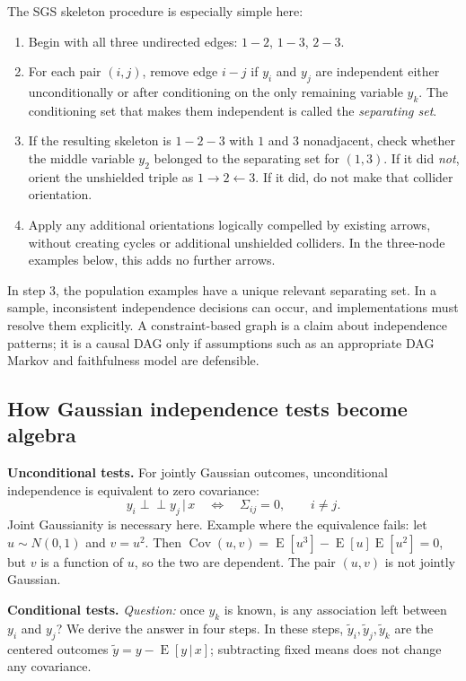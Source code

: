 \documentclass[11pt,a4paper]{article}
\newcommand{\Cov}{\operatorname{Cov}}
\newcommand{\E}{\operatorname{E}}
\newcommand{\indep}{\mathrel{\perp\!\!\!\perp}}
\newcommand{\given}{\,\vert\,}
\newcommand{\yt}{\widetilde y}
\begin{document}
The SGS skeleton procedure is especially simple here:
\begin{enumerate}[leftmargin=*,label=\arabic*.]
\item Begin with all three undirected edges: $1-2$, $1-3$, $2-3$.
\item For each pair $(i,j)$, remove edge $i-j$ if $y_i$ and $y_j$ are independent either unconditionally or after conditioning on the only remaining variable $y_k$. The conditioning set that makes them independent is called the \emph{separating set}.
\item If the resulting skeleton is $1-2-3$ with $1$ and $3$ nonadjacent, check whether the middle variable $y_2$ belonged to the separating set for $(1,3)$. If it did \emph{not}, orient the unshielded triple as $1\to2\leftarrow3$. If it did, do not make that collider orientation.
\item Apply any additional orientations logically compelled by existing arrows, without creating cycles or additional unshielded colliders. In the three-node examples below, this adds no further arrows.
\end{enumerate}
In step 3, the population examples have a unique relevant separating set. In a sample, inconsistent independence decisions can occur, and implementations must resolve them explicitly. A constraint-based graph is a claim about independence patterns; it is a causal DAG only if assumptions such as an appropriate DAG Markov and faithfulness model are defensible.

\subsection{How Gaussian independence tests become algebra}

\textbf{Unconditional tests.} For jointly Gaussian outcomes, unconditional independence is equivalent to zero covariance:
\begin{equation}
 y_i\indep y_j\given x \quad\Longleftrightarrow\quad\Sigma_{ij}=0,\qquad i\ne j.\label{eq:uncor}
\end{equation}
Joint Gaussianity is necessary here. Example where the equivalence fails: let $u\sim N(0,1)$ and $v=u^2$. Then $\Cov(u,v)=\E[u^3]-\E[u]\E[u^2]=0$, but $v$ is a function of $u$, so the two are dependent. The pair $(u,v)$ is not jointly Gaussian.

\textbf{Conditional tests.} \emph{Question:} once $y_k$ is known, is any association left between $y_i$ and $y_j$? We derive the answer in four steps. In these steps, $\yt_i,\yt_j,\yt_k$ are the centered outcomes $\yt=y-\E[y\given x]$; subtracting fixed means does not change any covariance.
\end{document}
